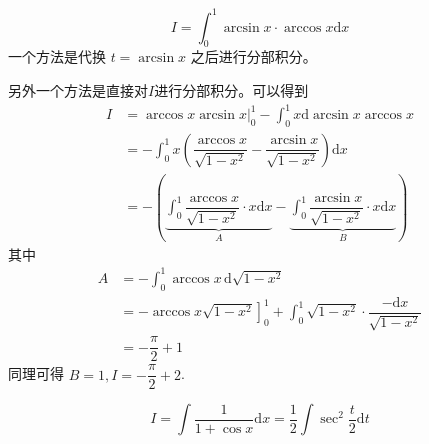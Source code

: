 \begin{example}
    \[
        I = \int_0^1 \arcsin x \cdot \arccos x \mathrm{d}x
    \]
    \cite[page 24, question 59]{w660}
    一个方法是代换 $t = \arcsin x$ 之后进行分部积分。

    另外一个方法是直接对$I$进行分部积分。可以得到
    \begin{align*}
        I &= \left. \arccos x \arcsin x \right|^{1}_{0} 
             - \int_0^1 x \mathrm{d} \arcsin x \arccos x \\
          &= - \int_0^1 x 
          \left(
              \dfrac{\arccos x}{\sqrt{1-x^2}} 
              - \dfrac{\arcsin x}{\sqrt{1-x^2}}
          \right)
          \mathrm{d}x \\
          &= - 
          \left(
              \underbrace{
                  \int_0^1
                      \dfrac{\arccos x}{\sqrt{1-x^2}} \cdot x
                  \mathrm{d}x 
              }_{A}
              -
              \underbrace{
                  \int_0^1
                      \dfrac{\arcsin x}{\sqrt{1-x^2}} \cdot x
                  \mathrm{d}x 
              }_{B}
          \right)
    \end{align*}
    其中
    \begin{align*}
        A &= - \int_0^1 \arccos x \, \mathrm{d} \sqrt{1-x^2} \\
          &= \left.- \arccos x \sqrt{1-x^2}\right]_0^1 + \int_0^1 \sqrt{1-x^2} \cdot 
              \dfrac{-\mathrm{d}x}{\sqrt{1-x^2}} \\
          &= - \dfrac{\pi}{2} + 1 
    \end{align*}
    同理可得 $B = 1, I = -\dfrac{\pi}{2} + 2$.
\end{example}

\begin{example}
    \[
        I = \int \dfrac{1}{1+\cos x} \mathrm{d}x 
          = \dfrac{1}{2} \int \sec^2 \dfrac{t}{2} \mathrm{d}t
    \]
\end{example}

